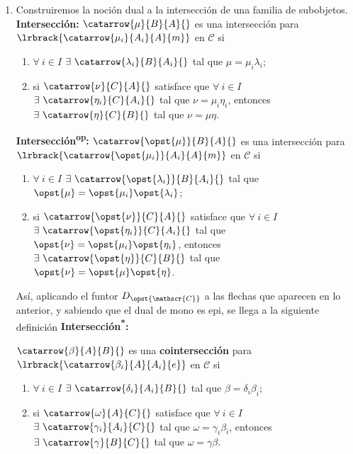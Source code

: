\documentclass{article}
\begin{document}
\begin{enumerate}[label=\textbf{Ej \arabic*.}]
		\item Construiremos la noción dual a la intersección de una familia de subobjetos.\\
		\textbf{Intersección:} $\catarrow{\mu}{B}{A}{}$ es una intersección para $\lrbrack{\catarrow{\mu_i}{A_i}{A}{m}}$ en $\mathscr{C}$ si \begin{enumerate}[label=Int\Roman*)]
			\item $\forall\ i\in I$ $\exists\ \catarrow{\lambda_i}{B}{A_i}{}$ tal que $\mu=\mu_i\lambda_i$;
			\item si $\catarrow{\nu}{C}{A}{}$ satisface que $\forall\ i\in I$ $\exists\ \catarrow{\eta_i}{C}{A_i}{}$ tal que $\nu=\mu_i\eta_i$, entonces $\exists\ \catarrow{\eta}{C}{B}{}$ tal que $\nu=\mu\eta$.
		\end{enumerate}
		\textbf{Intersección\textsuperscript{op}:} $\catarrow{\opst{\mu}}{B}{A}{}$ es una intersección para $\lrbrack{\catarrow{\opst{\mu_i}}{A_i}{A}{m}}$ en $\mathscr{C}$ si\begin{enumerate}[label=Int\textsuperscript{op}\Roman*)]
			\item $\forall\ i\in I$ $\exists\ \catarrow{\opst{\lambda_i}}{B}{A_i}{}$ tal que $\opst{\mu}=\opst{\mu_i}\opst{\lambda_i}$;
			\item si $\catarrow{\opst{\nu}}{C}{A}{}$ satisface que $\forall\ i\in I$ $\exists\ \catarrow{\opst{\eta_i}}{C}{A_i}{}$ tal que $\opst{\nu}=\opst{\mu_i}\opst{\eta_i}$, entonces $\exists\ \catarrow{\opst{\eta}}{C}{B}{}$ tal que $\opst{\nu}=\opst{\mu}\opst{\eta}$.
		\end{enumerate}
		Así, aplicando el funtor $D_{\opst{\mathscr{C}}}$ a las flechas que aparecen en lo anterior, y sabiendo que el dual de mono es epi, se llega a la siguiente definición
		\textbf{Intersección\textsuperscript{*}:}
		\begin{definesn}
			$\catarrow{\beta}{A}{B}{}$ es una \textbf{cointersección} para $\lrbrack{\catarrow{\beta_i}{A}{A_i}{e}}$ en $\mathscr{C}$ si
		\begin{enumerate}[label=Coint\Roman*)]
			\item $\forall\ i\in I$ $\exists\ \catarrow{\delta_i}{A_i}{B}{}$ tal que $\beta=\delta_i\beta_i$;
			\item si $\catarrow{\omega}{A}{C}{}$ satisface que $\forall\ i\in I$ $\exists\ \catarrow{\gamma_i}{A_i}{C}{}$ tal que $\omega=\gamma_i\beta_i$, entonces $\exists\ \catarrow{\gamma}{B}{C}{}$ tal que $\omega=\gamma\beta$.
		\end{enumerate}
		\end{definesn}		

\end{enumerate}
\end{document}
